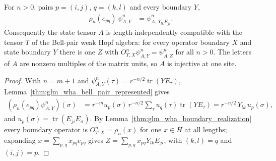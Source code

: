 \begin{lemma}
    \label{thm:glm_wha_bell_pair_compatible}
    \leanok
    For $n>0$, pairs $p=(i,j)$, $q=(k,l)$ and every boundary $Y$,
    \begin{align*}
        \rho_n(e_{pq})\,\psi^n_{A,Y} & =\psi^n_{A,\,Y_{lk}E_{ji}}.
    \end{align*}
    Consequently the state tensor $A$ is length-independently compatible with
    the tensor $T$ of the Bell-pair weak Hopf algebra: for every operator
    boundary $X$ and state boundary $Y$ there is one $Z$ with
    $O^n_{T,X}\psi^n_{A,Y}=\psi^n_{A,Z}$ for all $n>0$. The letters of $A$ are
    nonzero multiples of the matrix units, so $A$ is injective at one site.
\end{lemma}
\begin{proof}
    \leanok
    With $n=m+1$ and $\psi^n_{A,Y}(\tau)=r^{-n/2}\operatorname{tr}(YE_\tau)$,
    Lemma~\ref{thm:glm_wha_bell_pair_represented} gives
    \begin{align*}
        (\rho_n(e_{pq})\psi^n_{A,Y})(\sigma)
         & =r^{-m}u_p(\sigma)\,r^{-n/2}\sum_\tau u_q(\tau)
        \operatorname{tr}(YE_\tau)
        =r^{-n/2}\,Y_{lk}\,u_p(\sigma),
    \end{align*}
    and $u_p(\sigma)=\operatorname{tr}(E_{ji}E_\sigma)$. By
    Lemma~\ref{thm:glm_wha_boundary_realization} every boundary operator is
    $O^n_{T,X}=\rho_n(x)$ for one $x\in H$ at all lengths; expanding
    $x=\sum_{p,q}x_{pq}e_{pq}$ gives
    $Z=\sum_{p,q}x_{pq}Y_{lk}E_{ji}$, with $(k,l)=q$ and $(i,j)=p$.
\end{proof}


